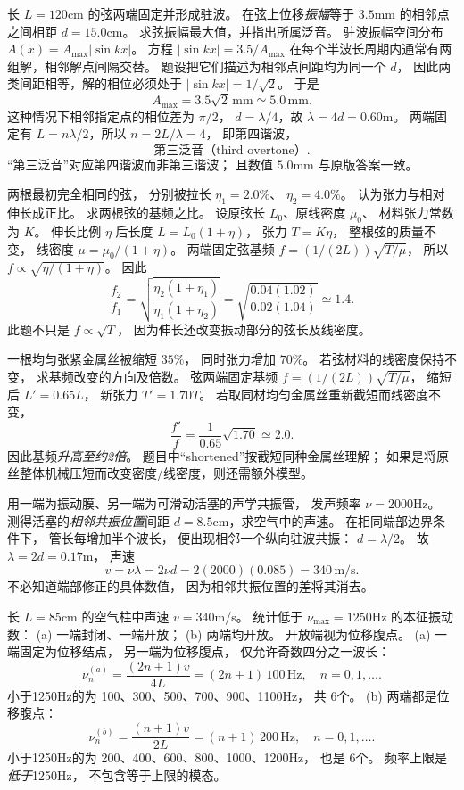长 $L=120$cm 的弦两端固定并形成驻波。
在弦上位移\emph{振幅}等于
$3.5$mm 的相邻点之间相距
$d=15.0$cm。
求弦振幅最大值，并指出所属泛音。
\exsolution
驻波振幅空间分布
$A(x)=A_{\max}|\sin kx|$。
方程 $|\sin kx|=3.5/A_{\max}$
在每个半波长周期内通常有两组解，相邻解点间隔交替。
题设把它们描述为相邻点间距均为同一个 $d$，
因此两类间距相等，解的相位必须处于
$|\sin kx|=1/\sqrt2$。
于是
\[
\boxed{A_{\max}=3.5\sqrt2\,\mathrm{mm}
\simeq5.0\,\mathrm{mm}}.
\]
这种情况下相邻指定点的相位差为 $\pi/2$，
$d=\lambda/4$，故 $\lambda=4d=0.60$m。
两端固定有
$L=n\lambda/2$，所以
$n=2L/\lambda=4$，
即第四谐波，
\[
\boxed{\text{第三泛音（third overtone）}}.
\]
\excheck “第三泛音”对应第四谐波而非第三谐波；
且数值 $5.0$mm 与原版答案一致。

两根最初完全相同的弦，
分别被拉长
$\eta_1=2.0\%$、
$\eta_2=4.0\%$。
认为张力与相对伸长成正比。
求两根弦的基频之比。
\exsolution
设原弦长 $L_0$、原线密度 $\mu_0$、
材料张力常数为 $K$。
伸长比例 $\eta$ 后长度
$L=L_0(1+\eta)$，
张力 $T=K\eta$，
整根弦的质量不变，
线密度 $\mu=\mu_0/(1+\eta)$。
两端固定弦基频
$f=(1/(2L))\sqrt{T/\mu}$，
所以
$f\propto\sqrt{\eta/(1+\eta)}$。
因此
\[
\boxed{\frac{f_2}{f_1}
=\sqrt{\frac{\eta_2(1+\eta_1)}
{\eta_1(1+\eta_2)}}}
=\sqrt{\frac{0.04(1.02)}{0.02(1.04)}}
\simeq1.4.
\]
\excheck 此题不只是 $f\propto\sqrt T$，
因为伸长还改变振动部分的弦长及线密度。

一根均匀张紧金属丝被缩短 $35\%$，
同时张力增加 $70\%$。
若弦材料的线密度保持不变，
求基频改变的方向及倍数。
\exsolution
弦两端固定基频
$f=(1/(2L))\sqrt{T/\mu}$，
缩短后
$L'=0.65L$，
新张力
$T'=1.70T$。
若取同材均匀金属丝重新截短而线密度不变，
\[
\boxed{\frac{f'}f=\frac1{0.65}\sqrt{1.70}
\simeq2.0}.
\]
因此基频\emph{升高至约2倍}。
\excheck 题目中“shortened”按截短同种金属丝理解；
如果是将原丝整体机械压短而改变密度/线密度，则还需额外模型。

用一端为振动膜、另一端为可滑动活塞的声学共振管，
发声频率 $\nu=2000$Hz。
测得活塞的\emph{相邻共振位置}间距
$d=8.5$cm，求空气中的声速。
\exsolution
在相同端部边界条件下，
管长每增加半个波长，
便出现相邻一个纵向驻波共振：
$d=\lambda/2$。
故
$\lambda=2d=0.17$m，
声速
\[
\boxed{v=\nu\lambda=2\nu d
=2(2000)(0.085)
=340\,\mathrm{m/s}}.
\]
\excheck 不必知道端部修正的具体数值，
因为相邻共振位置的差将其消去。

长 $L=85$cm 的空气柱中声速
$v=340$m/s。
统计低于
$\nu_{\max}=1250$Hz 的本征振动数：
(a) 一端封闭、一端开放；
(b) 两端均开放。
开放端视为位移腹点。
\exsolution
(a) 一端固定为位移结点，
另一端为位移腹点，
仅允许奇数四分之一波长：
\[
\boxed{\nu_n^{(a)}
=\frac{(2n+1)v}{4L}
=(2n+1)\,100\,\mathrm{Hz}},
\quad n=0,1,\ldots.
\]
小于1250Hz的为
100、300、500、700、900、1100Hz，
共
$\boxed{6\text{个}}$。
(b) 两端都是位移腹点：
\[
\boxed{\nu_n^{(b)}
=\frac{(n+1)v}{2L}
=(n+1)\,200\,\mathrm{Hz}},
\quad n=0,1,\ldots.
\]
小于1250Hz的为
200、400、600、800、1000、1200Hz，
也是
$\boxed{6\text{个}}$。
\excheck 频率上限是\emph{低于}1250Hz，
不包含等于上限的模态。


